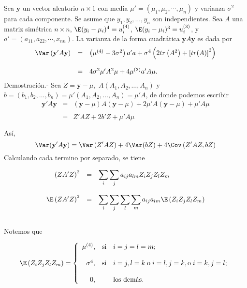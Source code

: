 \begin{teo}
    Sea $\textbf{y}$ un vector aleatorio $n\times 1$ con media $\mu'=(\mu_1,\mu_2,\cdots,\mu_n)$ y varianza $\sigma^2$ para cada componente. Se asume que $y_1,y_2,\ldots,y_n$ son independientes. Sea $A$ una matriz simétrica $n\times n$, $\E(y_i-\mu_i)^4=u_i^{(4)}$, $\E(y_i-\mu_i)^3=u_i^{(3)}$, y $a'=(a_{11},a_{22},\cdots,x_{nn})$. La varianza de la forma cuadrática $\textbf{y}A\textbf{y}$ es dada por 
    $$
    \begin{array}{rcl}
	\Var\left(\textbf{y}'A\textbf{y}\right) &=& \left(\mu^{(4)}-3\sigma^2\right)a'a+\sigma^4\left(2tr\left(A^2\right)+\left[tr(A)\right]^2\right)\\\\
						&=& 4\sigma^2\mu'A^2\mu+4\mu^{(3)}a'A\mu.
    \end{array}
    $$
    \vspace{.5cm}
	Demostración.-\; Sea $Z=\textbf{y}-\mu,$ $A(A_1,A_2,\ldots,A_n)$ y $b=(b_1,b_2,\ldots,b_n)=\mu'(A_1,A_2,\ldots,A_n)=\mu'A$, de donde podemos escribir
    $$
    \begin{array}{rcl}
	\textbf{y}'A\textbf{y} &=& (\textbf{y}-\mu)A(\textbf{y}-\mu)+2\mu'A(\textbf{y}-\mu)+\mu'A\mu\\\\
			       &=& Z'AZ+2b'Z+\mu'A\mu\\\\
    \end{array}
    $$
    Así,
    $$\Var(\textbf{y}'A\textbf{y})=\Var\left(Z'AZ\right)+4\Var(bZ)+4\Cov\left(Z'AZ,bZ\right)$$
    Calculando cada termino por separado, se tiene

    $$
    \begin{array}{rcl}
	\left(ZA'Z\right)^2 &=& \displaystyle\sum_i\sum_j a_{ij}a_{lm} Z_iZ_jZ_lZ_m\\\\
	\E\left(ZA'Z\right)^2 &=& \displaystyle\sum_i\sum_j\sum_l\sum_m a_{ij}a_{lm} \E\left(Z_iZ_jZ_lZ_m\right)\\\\
    \end{array}
    $$

    Notemos que

    $$
    \E\left(Z_iZ_jZ_lZ_m\right) = 
    \left\{
	\begin{array}{rcl}
	    \mu^{(4)}, &\text{si} & i=j=l=m;\\\\
	    \sigma^4, &\text{si} & i=j, l=k\; \mbox{o}\; i=l, j=k, \mbox{o}\; i=k, j=l;\\\\
	    0, & &\mbox{los demás}.
	\end{array}
    \right.
    $$


\end{teo}
